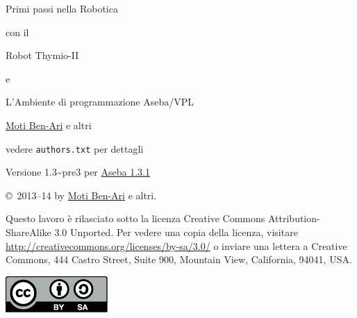 
\thispagestyle{empty}

\begin{center}
\begin{Huge}
\begin{bfseries}
Primi passi nella Robotica
\end{bfseries}

con il

\begin{bfseries}
Robot Thymio-II
\end{bfseries}

e

\begin{bfseries}
L'Ambiente di programmazione Aseba/VPL
\end{bfseries}

\end{Huge}

\vskip 2cm

\begin{LARGE}
\href{http://www.weizmann.ac.il/sci-tea/benari/}{Moti Ben-Ari} e altri\\
\end{LARGE}
\bigskip
\begin{Large}
vedere \texttt{authors.txt} per dettagli
\end{Large}

\vskip 1cm

\begin{Large}
Versione 1.3{\textasciitilde}pre3 per \href{https://aseba.wikidot.com/en:downloadinstall}{Aseba 1.3.1}
\end{Large}

\end{center}

\vfill

\begin{center}
\copyright{}\  2013--14 by \href{http://www.weizmann.ac.il/sci-tea/benari/}{Moti Ben-Ari} e altri.
\end{center}

Questo lavoro è rilasciato sotto la licenza Creative Commons
Attribution-ShareAlike 3.0 Unported. Per vedere una copia della licenza, visitare
\url{http://creativecommons.org/licenses/by-sa/3.0/}
o inviare una lettera a Creative Commons, 444 Castro Street, Suite 900,
Mountain View, California, 94041, USA.

\begin{center}
\includegraphics[width=.2\textwidth]{../images/by-sa}
\end{center}

\newpage
\tableofcontents
\thispagestyle{empty}
\newpage
\setcounter{page}{1}
